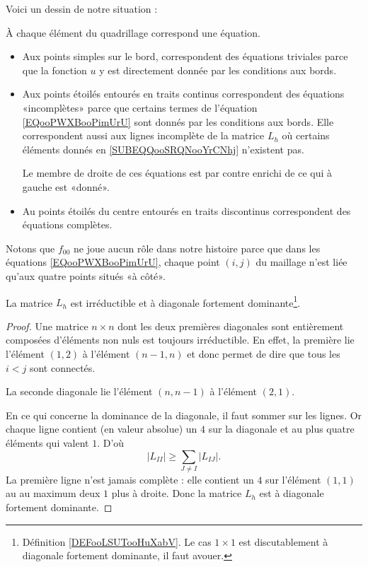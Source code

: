 Voici un dessin de notre situation :

\begin{center}
   
\end{center}

À chaque élément du quadrillage correspond une équation. 
\begin{itemize}
    \item 
        Aux points simples sur le bord, correspondent des équations triviales parce que la fonction \(u \) y est directement donnée par les conditions aux bords.
    \item
        Aux points étoilés entourés en traits continus correspondent des équations «incomplètes» parce que certains termes de l'équation \eqref{EQooPWXBooPimUrU} sont donnés par les conditions aux bords. Elle correspondent aussi aux lignes incomplète de la matrice \( L_h\) où certains éléments donnés en \eqref{SUBEQQooSRQNooYrCNhj} n'existent pas.

        Le membre de droite de ces équations est par contre enrichi de ce qui à gauche est «donné».

    \item
        Au points étoilés du centre entourés en traits discontinus correspondent des équations complètes.

\end{itemize}

Notons que \( f_{00}\) ne joue aucun rôle dans notre histoire parce que dans les équations \eqref{EQooPWXBooPimUrU}, chaque point \( (i,j)\) du maillage n'est liée qu'aux quatre points situés «à côté».


\begin{proposition} \label{PROPooWGTRooVjWhYY}
    La matrice \(L_h\) est irréductible et à diagonale fortement dominante\footnote{Définition \ref{DEFooLSUTooHuXabV}. Le cas \( 1\times 1\) est discutablement à diagonale fortement dominante, il faut avouer.}.
\end{proposition}

\begin{proof}
    Une matrice \( n\times n\) dont les deux premières diagonales sont entièrement composées d'éléments non nuls est toujours irréductible. En effet, la première lie l'élément \( (1,2)\) à l'élément \( (n-1,n)\) et donc permet de dire que tous les \( i<j\) sont connectés.

    La seconde diagonale lie l'élément \( (n,n-1)\) à l'élément \( (2,1)\).

    En ce qui concerne la dominance de la diagonale, il faut sommer sur les lignes. Or chaque ligne contient (en valeur absolue) un \( 4\) sur la diagonale et au plus quatre éléments qui valent \( 1\). D'où
    \begin{equation}
        | L_{II} |\geq \sum_{J\neq I}| L_{IJ} |.
    \end{equation}
    La première ligne n'est jamais complète : elle contient un \( 4\) sur l'élément \( (1,1)\) au au maximum deux \( 1\) plus à droite. Donc la matrice \( L_h\) est à diagonale fortement dominante.
\end{proof}


